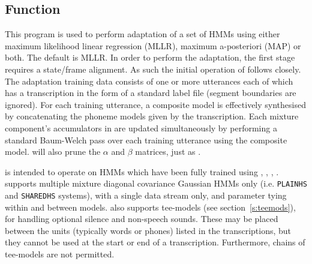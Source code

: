 
\newpage
{}

\subsection{Function}
This program is used to perform 
adaptation of a set of HMMs using either maximum likelihood linear 
regression (MLLR), maximum a-posteriori (MAP) or both. 
The default is MLLR.
In order to perform the adaptation, the first stage requires a
state/frame alignment. As such the initial operation of 
follows  closely. The adaptation training
data consists of one or more utterances each of which has a 
transcription in the form of a standard label file (segment
boundaries are ignored).  For each training utterance, a
composite model is effectively synthesised by concatenating
the phoneme models given by the transcription.  Each mixture
component's accumulators in 
are updated simultaneously by performing a standard Baum-Welch pass over
each training utterance using the composite model.
 will also prune the
$\alpha$ and $\beta$ matrices, just as .  
  
 is intended to operate on HMMs which have been fully
trained using , , , .
 supports multiple mixture diagonal covariance Gaussian
HMMs only (i.e. \texttt{PLAINHS} and \texttt{SHAREDHS} systems),
with a single data stream only, and parameter tying within and between models. 
 also supports tee-models
(see section~\ref{s:teemods}), for handling optional silence and non-speech
sounds. These may be placed between the units (typically words or phones)
listed in the transcriptions, but they cannot be used at the start or end of a
transcription. Furthermore, chains of tee-models are not permitted.

